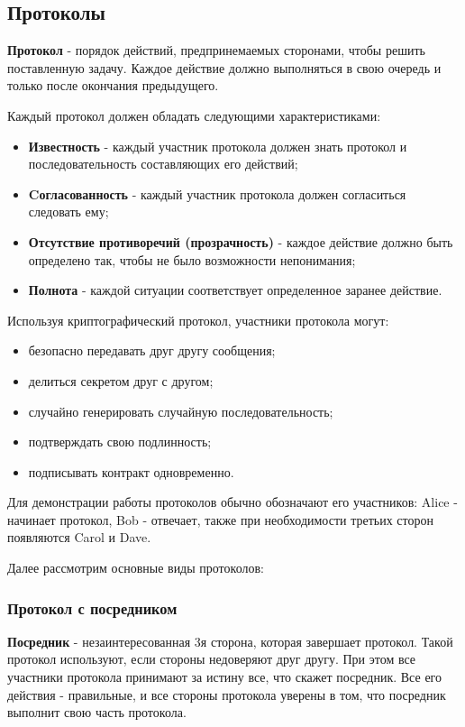 \documentclass[a4paper]{article}
\begin{document}
\subsection{Протоколы}
\textbf{Протокол} - порядок действий, предпринемаемых сторонами, чтобы решить поставленную задачу. Каждое действие должно выполняться в свою очередь и только
после окончания предыдущего.
\par
Каждый протокол должен обладать следующими характеристиками:
\begin{itemize}
    \item \textbf{Известность} - каждый участник протокола должен знать протокол и последовательность составляющих его действий;
    \item \textbf{Cогласованность} - каждый участник протокола должен согласиться следовать ему;
    \item \textbf{Отсутствие противоречий (прозрачность)} - каждое действие должно быть определено так, чтобы не было возможности непонимания;
    \item \textbf{Полнота} -  каждой ситуации соответствует определенное заранее действие.
\end{itemize}

Используя криптографический протокол, участники протокола могут:
\begin{itemize}
    \item безопасно передавать друг другу сообщения;
    \item делиться секретом друг с другом;
    \item случайно генерировать случайную последовательность;
    \item подтверждать свою подлинность;
    \item подписывать контракт одновременно.
\end{itemize}

Для демонстрации работы протоколов обычно обозначают его участников: Alice - начинает протокол, Bob - отвечает, также при необходимости третьих сторон появляются Carol и Dave.
\par 
Далее рассмотрим основные виды протоколов: \par
\subsubsection{Протокол с посредником}
\textbf{Посредник} - незаинтересованная 3я сторона, которая завершает протокол. Такой протокол используют, если стороны недоверяют друг другу. При этом все участники протокола принимают за истину все, что скажет посредник. 
Все его действия - правильные, и все стороны протокола уверены в том, что посредник выполнит свою часть протокола.
\end{document}
